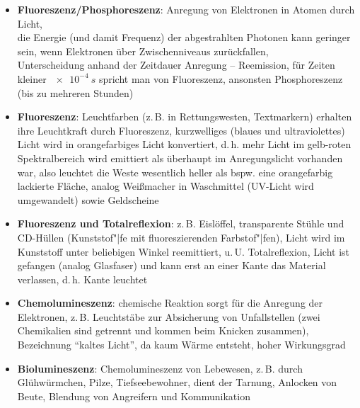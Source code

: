 \begin{itemize}
    \item
    \textbf{Fluoreszenz/Phosphoreszenz}:
    Anregung von Elektronen in Atomen durch Licht, \\
    die Energie (und damit Frequenz) der abgestrahlten Photonen
    kann geringer sein,
    wenn Elektronen über Zwischenniveaus zurückfallen, \\
    Unterscheidung anhand der Zeitdauer Anregung -- Reemission,
    für Zeiten kleiner $\SI{e-4}{s}$ spricht man von
    Fluoreszenz, ansonsten Phosphoreszenz (bis zu mehreren Stunden)
    
    \item
    \textbf{Fluoreszenz}:
    Leuchtfarben (z.\,B. in Rettungswesten, Textmarkern) erhalten ihre
    Leuchtkraft durch Fluoreszenz,
    kurzwelliges (blaues und ultraviolettes) Licht wird in orangefarbiges
    Licht konvertiert, d.\,h. mehr Licht im gelb-roten Spektralbereich wird
    emittiert als überhaupt im Anregungslicht vorhanden war, also leuchtet
    die Weste wesentlich heller als bspw. eine orangefarbig lackierte Fläche,
    analog Weißmacher in Waschmittel (UV-Licht wird umgewandelt)
    sowie Geldscheine
    
    \item
    \textbf{Fluoreszenz und Totalreflexion}:
    z.\,B. Eislöffel, transparente Stühle und CD-Hüllen
    (Kunststof"|fe mit fluoreszierenden Farbstof"|fen),
    Licht wird im Kunststoff unter beliebigen Winkel reemittiert,
    u.\,U. Totalreflexion, Licht ist gefangen (analog Glasfaser) und
    kann erst an einer Kante das Material verlassen, d.\,h. Kante leuchtet
\end{itemize}
\linie
\begin{itemize}
    \item
    \textbf{Chemolumineszenz}:
    chemische Reaktion sorgt für die Anregung der Elektronen, z.\,B.
    Leuchtstäbe zur Absicherung von Unfallstellen
    (zwei Chemikalien sind getrennt und kommen beim Knicken zusammen),
    Bezeichnung "`kaltes Licht"', da kaum Wärme entsteht, hoher Wirkungsgrad
    
    \item
    \textbf{Biolumineszenz}:
    Chemolumineszenz von Lebewesen, z.\,B. durch Glühwürmchen, Pilze,
    Tiefseebewohner, dient der Tarnung, Anlocken von Beute,
    Blendung von Angreifern und Kommunikation
\end{itemize}
\linie
